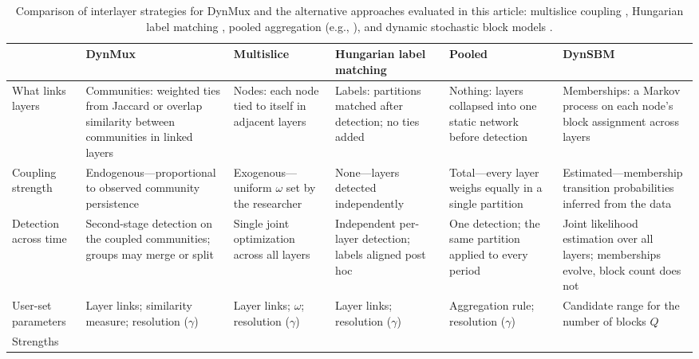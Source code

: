 \documentclass[11pt, letterpaper]{article}
\begin{document}
\begin{table}[t]
\scriptsize
\centering
\caption{Comparison of interlayer strategies for DynMux and the alternative
approaches evaluated in this article: multislice coupling
\citep{mucha2010community}, Hungarian label matching
\citep{kuhn1955hungarian}, pooled aggregation (e.g.,
\citealp{moody2004structure}), and dynamic stochastic block models
\citep{matias2017statistical}.}
\label{tab:mechanisms}
\begin{tabular}{@{}L{1.9cm}L{2.5cm}L{2.4cm}L{2.4cm}L{2.4cm}L{2.4cm}@{}}
\toprule
 & DynMux & Multislice & Hungarian label matching & Pooled & DynSBM \\
\midrule
What links layers &
Communities: weighted ties from Jaccard or overlap similarity between
communities in linked layers &
Nodes: each node tied to itself in adjacent layers &
Labels: partitions matched after detection; no ties added &
Nothing: layers collapsed into one static network before detection &
Memberships: a Markov process on each node's block assignment across
layers \\
\addlinespace
Coupling strength &
Endogenous---proportional to observed community persistence &
Exogenous---uniform $\omega$ set by the researcher &
None---layers detected independently &
Total---every layer weighs equally in a single partition &
Estimated---membership transition probabilities inferred from the data \\
\addlinespace
Detection across time &
Second-stage detection on the coupled communities; groups may merge or
split &
Single joint optimization across all layers &
Independent per-layer detection; labels aligned post hoc &
One detection; the same partition applied to every period &
Joint likelihood estimation over all layers; memberships evolve, block
count does not \\
\addlinespace
User-set parameters &
Layer links; similarity measure; resolution ($\gamma$) &
Layer links; $\omega$; resolution ($\gamma$) &
Layer links; resolution ($\gamma$) &
Aggregation rule; resolution ($\gamma$) &
Candidate range for the number of blocks $Q$ \\
\addlinespace
Strengths &

\end{tabular}
\end{table}
\end{document}
